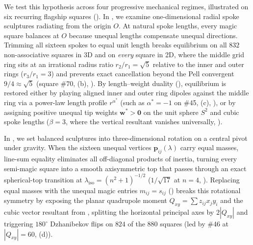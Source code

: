 We test this hypothesis across four progressive mechanical regimes, illustrated on six recurring flagship squares (). In , we examine one-dimensional radial spoke sculptures radiating from the origin $O$. At natural spoke lengths, every magic square balances at $O$ because unequal lengths compensate unequal directions. Trimming all sixteen spokes to equal unit length breaks equilibrium on all $832$ non-associative squares in 3D and on \emph{every} square in 2D, where the middle grid ring sits at an irrational radius ratio $r_2/r_1=\sqrt{5}$ relative to the inner and outer rings ($r_3/r_1=3$) and prevents exact cancellation beyond the Pell convergent $9/4\approx\sqrt{5}$ (square \#70, (b), ). By length--weight duality (), equilibrium is restored either by playing aligned inner and outer ring dipoles against the middle ring via a power-law length profile $r^{\alpha^*}$ (such as $\alpha^*=-1$ on \#45, (c), ), or by assigning positive unequal tip weights $\mathbf w^*>\mathbf 0$ on the unit sphere $S^2$ and cubic spoke lengths ($\beta=3$, where the vertical resultant vanishes universally, ).

In , we set balanced sculptures into three-dimensional rotation on a central pivot under gravity. When the sixteen unequal vertices $\mathbf p_{ij}(\lambda)$ carry equal masses, line-sum equality eliminates all off-diagonal products of inertia, turning every semi-magic square into a smooth axisymmetric top that passes through an exact spherical-top transition at $\lambda_{\mathrm{iso}}=(n^2+1)^{-1/2}$ ($1/\sqrt{17}$ at $n=4$, ). Replacing equal masses with the unequal magic entries $m_{ij}=s_{ij}$ () breaks this rotational symmetry by exposing the planar quadrupole moment $Q_{xy}=\sum z_{ij}x_jy_i$ and the cubic vector resultant from , splitting the horizontal principal axes by $2|Q_{xy}|$ and triggering $180^\circ$ Dzhanibekov flips on $824$ of the $880$ squares (led by \#46 at $|Q_{xy}|=60$, (d)).

